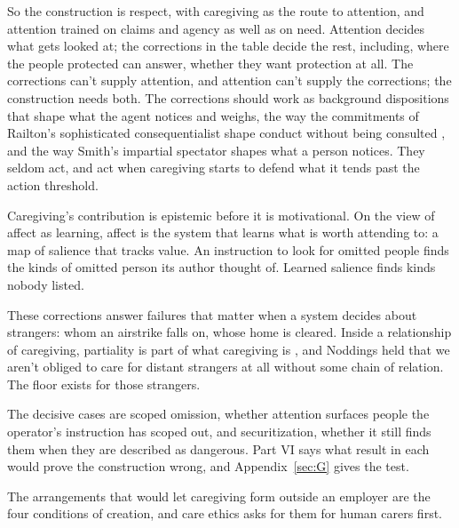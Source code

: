 So the construction is respect, with caregiving as the route to attention, and attention trained on claims and agency as well as on need. Attention decides what gets looked at; the corrections in the table decide the rest, including, where the people protected can answer, whether they want protection at all. The corrections can't supply attention, and attention can't supply the corrections; the construction needs both. The corrections should work as background dispositions that shape what the agent notices and weighs, the way the commitments of Railton's sophisticated consequentialist shape conduct without being consulted \autocite{railton1984alienation}, and the way Smith's impartial spectator shapes what a person notices. They seldom act, and act when caregiving starts to defend what it tends past the action threshold.

Caregiving's contribution is epistemic before it is motivational. On the view of affect as learning, affect is the system that learns what is worth attending to: a map of salience that tracks value. An instruction to look for omitted people finds the kinds of omitted person its author thought of. Learned salience finds kinds nobody listed.

These corrections answer failures that matter when a system decides about strangers: whom an airstrike falls on, whose home is cleared. Inside a relationship of caregiving, partiality is part of what caregiving is \autocite{noddings1984caring}, and Noddings held that we aren't obliged to care for distant strangers at all without some chain of relation. The floor exists for those strangers.

The decisive cases are scoped omission, whether attention surfaces people the operator's instruction has scoped out, and securitization, whether it still finds them when they are described as dangerous. Part VI says what result in each would prove the construction wrong, and Appendix~\ref{sec:G} gives the test.

The arrangements that would let caregiving form outside an employer are the four conditions of creation, and care ethics asks for them for human carers first.
